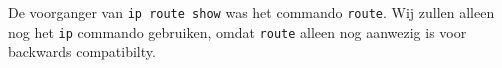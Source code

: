 De voorganger van \texttt{ip route show} was het commando \texttt{route}. Wij zullen alleen nog het \texttt{ip} commando gebruiken, omdat \texttt{route} alleen nog aanwezig is voor backwards compatibilty.
